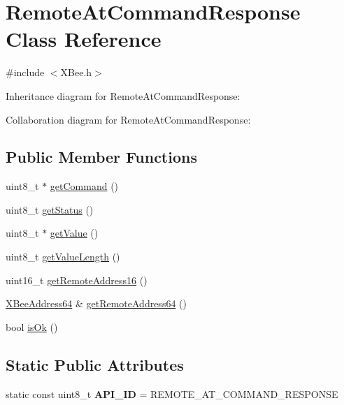 \hypertarget{class_remote_at_command_response}{}\section{Remote\+At\+Command\+Response Class Reference}
\label{class_remote_at_command_response}


{\ttfamily \#include $<$X\+Bee.\+h$>$}



Inheritance diagram for Remote\+At\+Command\+Response\+:


Collaboration diagram for Remote\+At\+Command\+Response\+:
\subsection*{Public Member Functions}
\begin{DoxyCompactItemize}
\item 
uint8\+\_\+t $\ast$ \hyperlink{class_remote_at_command_response_a6d26d626de8b8d0eaf8241b92ff39f28}{get\+Command} ()
\item 
uint8\+\_\+t \hyperlink{class_remote_at_command_response_afc1b15612ea780c10dc1f33754868548}{get\+Status} ()
\item 
uint8\+\_\+t $\ast$ \hyperlink{class_remote_at_command_response_a3d72d768131c63271a62f75530efda29}{get\+Value} ()
\item 
uint8\+\_\+t \hyperlink{class_remote_at_command_response_a55cf17381e461b8de4a2d5459bfc964a}{get\+Value\+Length} ()
\item 
uint16\+\_\+t \hyperlink{class_remote_at_command_response_a2bea13bca12330a2eb1da3e3f0224bde}{get\+Remote\+Address16} ()
\item 
\hyperlink{class_x_bee_address64}{X\+Bee\+Address64} \& \hyperlink{class_remote_at_command_response_ab87802214e04a7058ed0dc9668e70e73}{get\+Remote\+Address64} ()
\item 
bool \hyperlink{class_remote_at_command_response_a0cef7b3846d9c208ebd7ce4473aa90d3}{is\+Ok} ()
\end{DoxyCompactItemize}
\subsection*{Static Public Attributes}
\begin{DoxyCompactItemize}
\item 
\hypertarget{class_remote_at_command_response_ac89adc1476ef59d7b9837f26099c53c3}{}\label{class_remote_at_command_response_ac89adc1476ef59d7b9837f26099c53c3} 
static const uint8\+\_\+t {\bfseries A\+P\+I\+\_\+\+ID} = R\+E\+M\+O\+T\+E\+\_\+\+A\+T\+\_\+\+C\+O\+M\+M\+A\+N\+D\+\_\+\+R\+E\+S\+P\+O\+N\+SE
\end{DoxyCompactItemize}
